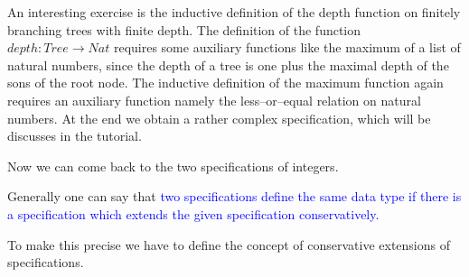 \documentclass[landscape, autoslides, light]{mmiss}
\begin{document}
\begin{Package}[Label={FSDPT}, Title={Formal Specification of Data and Process Types}, ShortTitle={FSDPT}, Authors={Horst Reichel}, Date={February 2003}, LevelOfDetail=Lecture, Language=en-GB]
\begin{Section}[Title={Initial Algebras as Data Types}, Label={section3}]
\begin{Section}[Title={Functional Enrichment of Data Types}, Label={section3_3}]
\begin{Paragraph}[Label=Paragraph52]
An interesting exercise is the inductive definition of the depth
function on finitely branching trees with finite depth. The
definition of the function $depth : Tree \to Nat$ requires some
auxiliary functions like the maximum of a list of natural numbers,
since the depth of a tree is one plus the maximal depth of the
sons of the root node. The inductive definition of the maximum
function again requires an auxiliary function namely the
less--or--equal relation on natural numbers. At the end we obtain
a rather complex specification, which will be discusses in the
tutorial.


\end{Paragraph}
\begin{Paragraph}[Title={Equivalence of Specifications}, Label=Paragraph53]
\small
Now we can come back to the two specifications of integers.

Generally one can say that \textcolor{blue}{two specifications
define the same data type if there is a specification which
extends the given specification conservatively.}

To make this precise we have to define the concept of conservative
extensions of specifications.


\end{Paragraph}
\begin{Paragraph}[Title={Equivalence of Specifications}, Label=Paragraph54]


\end{Paragraph}
\end{Section}
\end{Section}
\end{Package}
\end{document}
